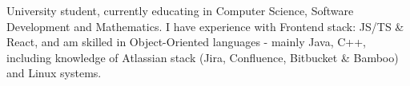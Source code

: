 \documentclass[letter,10pt]{article}
\begin{document}

  University student, currently educating in Computer Science, Software Development and Mathematics. I have experience with Frontend stack: JS/TS \& React, and am skilled in Object-Oriented languages - mainly Java, C++, including knowledge of Atlassian stack (Jira, Confluence, Bitbucket \& Bamboo) and Linux systems.
\end{document}
